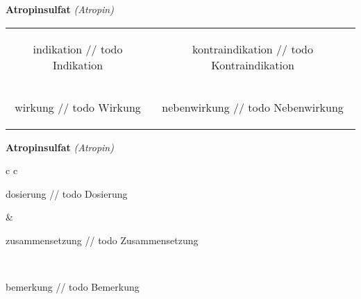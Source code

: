 \documentclass[12pt]{beamer}
\begin{document}
\begin{frame}{
    \textbf{Atropinsulfat}
    \textit{(Atropin)}
}
    \begin{tabular}{c c}
        \begin{beamercolorbox}[wd=\boxwidth\textwidth,ht=\boxheight\textheight,sep=1em]{indikation}
        // todo Indikation
        \end{beamercolorbox} & 
        \begin{beamercolorbox}[wd=\boxwidth\textwidth,ht=\boxheight\textheight,sep=1em]{kontraindikation}
        // todo Kontraindikation 
        \end{beamercolorbox} \\
        \begin{beamercolorbox}[wd=\boxwidth\textwidth,ht=\boxheight\textheight,sep=1em]{wirkung}
        // todo Wirkung
        \end{beamercolorbox} & 
        \begin{beamercolorbox}[wd=\boxwidth\textwidth,ht=\boxheight\textheight,sep=1em]{nebenwirkung}
        // todo Nebenwirkung
        \end{beamercolorbox} \\
    \end{tabular}
\end{frame}

\begin{frame}{
    \textbf{Atropinsulfat}
    \textit{(Atropin)}
}
    \begin{tabular}{c c}
        \begin{beamercolorbox}[wd=\boxwidth\textwidth,ht=\boxheight\textheight,sep=1em]{dosierung}
        // todo Dosierung
        \end{beamercolorbox} & 
        \begin{beamercolorbox}[wd=\boxwidth\textwidth,ht=\boxheight\textheight,sep=1em]{zusammensetzung}
        // todo Zusammensetzung
        \end{beamercolorbox} \\
        \begin{beamercolorbox}[wd=\textwidth,ht=\boxheight\textheight,sep=1em]{bemerkung}
        // todo Bemerkung
        \end{beamercolorbox} \\
    \end{tabular}
\end{frame}
\end{document}
